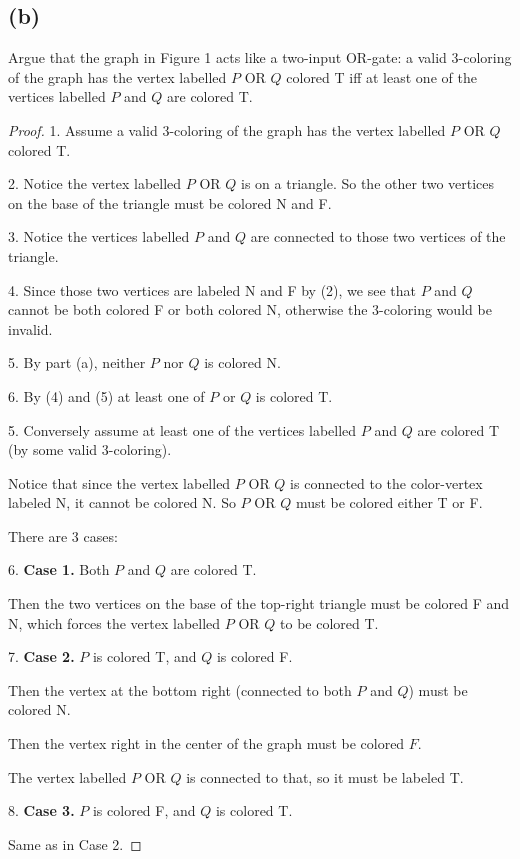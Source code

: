 \documentclass[14pt]{extarticle}
\begin{document}
\subsection{(b)}
Argue that the graph in Figure 1 acts like a two-input OR-gate: a valid 3-coloring of the graph has the vertex labelled $P$ OR $Q$ colored T iff at least one of the vertices labelled $P$ and $Q$ are colored T.
\begin{proof}
1. Assume a valid 3-coloring of the graph has the vertex labelled $P$ OR $Q$ colored T.

2. Notice the vertex labelled $P$ OR $Q$ is on a triangle. So the other two vertices on the base of the triangle must be colored N and F. 

3. Notice the vertices labelled $P$ and $Q$ are connected to those two vertices of the triangle. 

4. Since those two vertices are labeled N and F by (2), we see that $P$ and $Q$ cannot be both colored F or both colored N, otherwise the 3-coloring would be invalid.

5. By part (a), neither $P$ nor $Q$ is colored N.

6. By (4) and (5) at least one of $P$ or $Q$ is colored T.

5. Conversely assume at least one of the vertices labelled $P$ and $Q$ are colored T (by some valid 3-coloring). 

Notice that since the vertex labelled $P$ OR $Q$ is connected to the color-vertex labeled N, it cannot be colored N. So $P$ OR $Q$ must be colored either T or F.

There are 3 cases:

6. {\bf Case 1.} Both $P$ and $Q$ are colored T.

Then the two vertices on the base of the top-right triangle must be colored F and N, which forces the vertex labelled $P$ OR $Q$ to be colored T.

7. {\bf Case 2.} $P$ is colored T, and $Q$ is colored F.

Then the vertex at the bottom right (connected to both $P$ and $Q$) must be colored N.

Then the vertex right in the center of the graph must be colored $F$.

The vertex labelled $P$ OR $Q$ is connected to that, so it must be labeled T.

8. {\bf Case 3.} $P$ is colored F, and $Q$ is colored T.

Same as in Case 2.
\end{proof}
\end{document}

